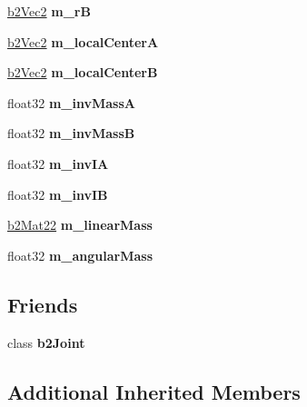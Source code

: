 \begin{DoxyCompactItemize}
\hyperlink{structb2_vec2}{b2\+Vec2} {\bfseries m\+\_\+rB}
\item 
\mbox{\label{classb2_friction_joint_af732965abe1f29f7469e1ea17506218c}} 
\hyperlink{structb2_vec2}{b2\+Vec2} {\bfseries m\+\_\+local\+CenterA}
\item 
\mbox{\label{classb2_friction_joint_a55739866c1f3423caf2116e0a869ec45}} 
\hyperlink{structb2_vec2}{b2\+Vec2} {\bfseries m\+\_\+local\+CenterB}
\item 
\mbox{\label{classb2_friction_joint_a7b7a482216efd081db94465db409fa21}} 
float32 {\bfseries m\+\_\+inv\+MassA}
\item 
\mbox{\label{classb2_friction_joint_a189a3869e59f6b1e00c83fcaf6b08253}} 
float32 {\bfseries m\+\_\+inv\+MassB}
\item 
\mbox{\label{classb2_friction_joint_aad004207b7392e9828f55d8f15dc2aa8}} 
float32 {\bfseries m\+\_\+inv\+IA}
\item 
\mbox{\label{classb2_friction_joint_a79ab8b49c2d4ce6415e3fe9376947d4c}} 
float32 {\bfseries m\+\_\+inv\+IB}
\item 
\mbox{\label{classb2_friction_joint_aa49bf4b20865a4976c3fae8398191182}} 
\hyperlink{structb2_mat22}{b2\+Mat22} {\bfseries m\+\_\+linear\+Mass}
\item 
\mbox{\label{classb2_friction_joint_ab8f9aa5e516d90f1c80f92b0eb410c38}} 
float32 {\bfseries m\+\_\+angular\+Mass}
\end{DoxyCompactItemize}
\subsection*{Friends}
\begin{DoxyCompactItemize}
\item 
\mbox{\label{classb2_friction_joint_a54ade8ed3d794298108d7f4c4e4793fa}} 
class {\bfseries b2\+Joint}
\end{DoxyCompactItemize}
\subsection*{Additional Inherited Members}


